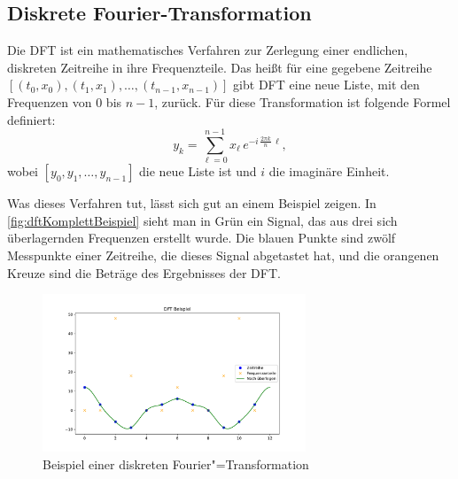\subsection{Diskrete Fourier-Transformation}
Die \ac{DFT} ist ein mathematisches Verfahren zur Zerlegung einer endlichen, diskreten Zeitreihe in ihre Frequenzteile. Das heißt für eine gegebene Zeitreihe $[(t_0,x_0),(t_1,x_1),\ldots,(t_{n-1},x_{n-1})]$ gibt \acs{DFT} eine neue Liste, mit den Frequenzen von 0 bis $n-1$, zurück. Für diese Transformation ist folgende Formel definiert:
\[y_k=\sum_{\ell=0}^{n-1}x_\ell\,e^{-i\,\tfrac{2\pi k}{n}\,\ell},\]
wobei $[y_0,y_1,\ldots,y_{n-1}]$ die neue Liste ist und $i$ die imaginäre Einheit.

Was dieses Verfahren tut, lässt sich gut an einem Beispiel zeigen. In \autoref{fig:dftKomplettBeispiel} sieht man in Grün ein Signal, das aus drei sich überlagernden Frequenzen erstellt wurde. Die blauen Punkte sind zwölf Messpunkte einer Zeitreihe, die dieses Signal abgetastet hat, und die orangenen Kreuze sind die Beträge des Ergebnisses der \acs{DFT}. 
\begin{figure}[bth] 
  \centering
  \includegraphics[width=0.7\textwidth]{Graphics/DFTExample1.pdf}
  \caption{Beispiel einer diskreten Fourier"=Transformation}
  \label{fig:dftKomplettBeispiel}
\end{figure}

